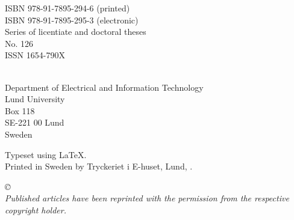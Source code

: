 \documentclass[11pt, twoside, openright]{book}
\begin{document}
\begin{titlepage}
{%
}

\newpage
\thispagestyle{empty}
\begin{flushleft}

ISBN 978-91-7895-294-6 (printed)\\
ISBN 978-91-7895-295-3 (electronic)\\
Series of licentiate and doctoral theses\\
No. 126\\
ISSN 1654-790X\linebreak[2]

\theauthor\\
Department of Electrical and Information Technology\\
Lund University\\
Box 118\\
SE-221 00  Lund\\
Sweden\linebreak[2]


Typeset using \LaTeX.\\

Printed in Sweden by Tryckeriet i E-huset, Lund, \thedate.\linebreak[2]

\textit{\copyright ~\thedate~\theauthor\\
Published articles have been reprinted with the permission from the respective copyright holder.}
\vspace{10mm}
\end{flushleft}
\end{titlepage}
\end{document}

